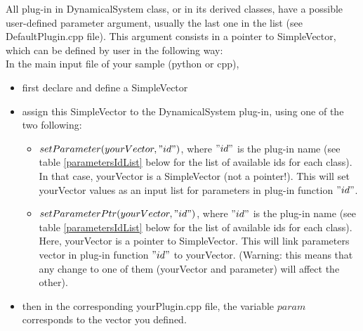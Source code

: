 \documentclass[10pt]{article}
\begin{document}
All plug-in in DynamicalSystem class, or in its derived classes, have a possible user-defined parameter argument, 
usually the last one in the list (see DefaultPlugin.cpp file). This argument consists in a pointer to SimpleVector, 
which can be defined by user in the following way: \\
In the main input file of your sample (python or cpp), 
\begin{itemize}
\item first declare and define a SimpleVector
\item assign this SimpleVector to the DynamicalSystem plug-in, using one of the two following:
\begin{itemize}
\item $setParameter(yourVector, "id")$, where $"id"$ is the plug-in name (see table \ref{parametersIdList} below for the list of available ids for each class). In that case, yourVector is a SimpleVector (not a pointer!).
This will set yourVector values as an input list for parameters in plug-in function $"id"$. 
\item  $setParameterPtr(yourVector, "id")$, where $"id"$ is the plug-in name (see table \ref{parametersIdList} below for the list of available ids for each class). Here, yourVector is a pointer to SimpleVector. 
This will link parameters vector in plug-in function $"id"$ to yourVector. (Warning: this means  that any change to one of them (yourVector and parameter) will affect the other). 
\end{itemize}
\item then in the corresponding yourPlugin.cpp file, the variable $param$ corresponds to the vector you defined. 
\end{itemize}
\end{document}

